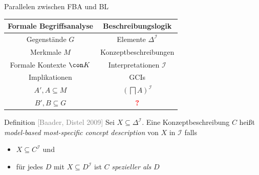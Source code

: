 \documentclass[ngerman]{beamer}
\newcommand{\pseudocite}[1]{\textcolor{gray}{[#1]}}
\begin{document}
\begin{frame}

  \onslide<+->

  \begin{block}{Parallelen zwischen FBA und BL}
    \begin{center}
      \begin{tabular}{c|c}
        Formale Begriffsanalyse & Beschreibungslogik \\
        \midrule\onslide<+->
        Gegenstände $G$ & Elemente $\Delta^{\mathcal{I}}$ \\\onslide<+->
        Merkmale $M$ & Konzeptbeschreibungen \\\onslide<+->
        Formale Kontexte $\con K$ & Interpretationen $\mathcal{I}$ \\\onslide<+->
        Implikationen & GCIs \\\onslide<+->
        $A', A \subseteq M$ & $(\bigsqcap A)^{\mathcal{I}}$ \\\onslide<+->
        $B', B \subseteq G$ & \textcolor{red}{\textbf{?}}
      \end{tabular}
    \end{center}
  \end{block}

  \onslide<+->

  \begin{block}{Definition \pseudocite{Baader, Distel 2009}}
    Sei $X \subseteq \Delta^{\mathcal{I}}$. \onslide<+-> Eine Konzeptbeschreibung $C$
    heißt \emph{model-based most-specific concept description} von $X$ in $\mathcal{I}$
    falls
    \begin{itemize}
    \item<+-> $X \subseteq C^{\mathcal{I}}$ und
    \item<+-> für jedes $D$ mit $X \subseteq D^{\mathcal{I}}$ ist $C$ \emph{spezieller
        als} $D$
    \end{itemize}
  \end{block}

\end{frame}




  
\end{document}
